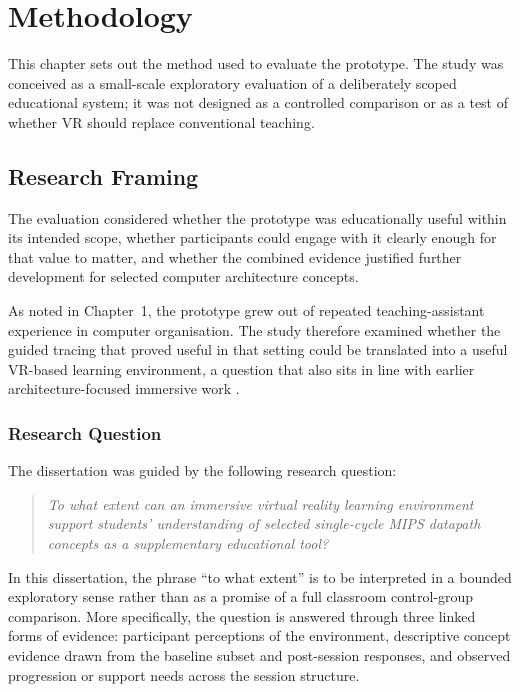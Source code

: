 \chapter{Methodology}

This chapter sets out the method used to evaluate the prototype. The study was conceived as a small-scale exploratory evaluation of a deliberately scoped educational system; it was not designed as a controlled comparison or as a test of whether VR should replace conventional teaching.

\section{Research Framing}

The evaluation considered whether the prototype was educationally useful within its intended scope, whether participants could engage with it clearly enough for that value to matter, and whether the combined evidence justified further development for selected computer architecture concepts.

As noted in Chapter~1, the prototype grew out of repeated teaching-assistant experience in computer organisation. The study therefore examined whether the guided tracing that proved useful in that setting could be translated into a useful VR-based learning environment, a question that also sits in line with earlier architecture-focused immersive work \cite{dascalu2017experiential,tan2023vr}.

\subsection{Research Question}

The dissertation was guided by the following research question:

\begin{quote}
\textit{To what extent can an immersive virtual reality learning environment support students' understanding of selected single-cycle MIPS datapath concepts as a supplementary educational tool?}
\end{quote}

In this dissertation, the phrase ``to what extent'' is to be interpreted in a bounded exploratory sense rather than as a promise of a full classroom control-group comparison. More specifically, the question is answered through three linked forms of evidence: participant perceptions of the environment, descriptive concept evidence drawn from the baseline subset and post-session responses, and observed progression or support needs across the session structure.

